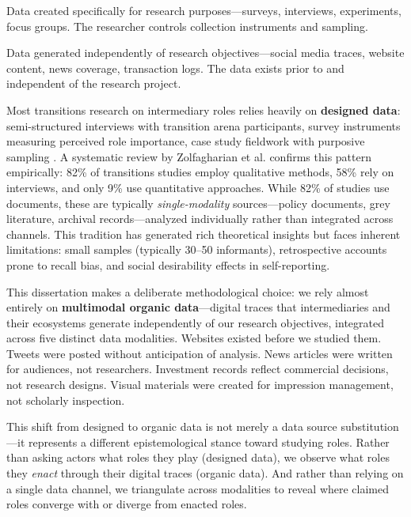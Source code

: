 \documentclass[../main.tex]{subfiles}
\begin{document}
\begin{description}[leftmargin=0.5cm, itemsep=0.3em]
\item[Designed data] Data created specifically for research purposes---surveys, interviews, experiments, focus groups. The researcher controls collection instruments and sampling.

\item[Organic data] Data generated independently of research objectives---social media traces, website content, news coverage, transaction logs. The data exists prior to and independent of the research project.
\end{description}

Most transitions research on intermediary roles relies heavily on \textbf{designed data}: semi-structured interviews with transition arena participants, survey instruments measuring perceived role importance, case study fieldwork with purposive sampling . A systematic review by Zolfagharian et al. \citeyear{zolfagharian2019studying} confirms this pattern empirically: 82\% of transitions studies employ qualitative methods, 58\% rely on interviews, and only 9\% use quantitative approaches. While 82\% of studies use documents, these are typically \emph{single-modality} sources---policy documents, grey literature, archival records---analyzed individually rather than integrated across channels. This tradition has generated rich theoretical insights but faces inherent limitations: small samples (typically 30--50 informants), retrospective accounts prone to recall bias, and social desirability effects in self-reporting.

\begin{insightbox}
This dissertation makes a deliberate methodological choice: we rely almost entirely on \textbf{multimodal organic data}---digital traces that intermediaries and their ecosystems generate independently of our research objectives, integrated across five distinct data modalities. Websites existed before we studied them. Tweets were posted without anticipation of analysis. News articles were written for audiences, not researchers. Investment records reflect commercial decisions, not research designs. Visual materials were created for impression management, not scholarly inspection.

This shift from designed to organic data is not merely a data source substitution---it represents a different epistemological stance toward studying roles. Rather than asking actors what roles they play (designed data), we observe what roles they \emph{enact} through their digital traces (organic data). And rather than relying on a single data channel, we triangulate across modalities to reveal where claimed roles converge with or diverge from enacted roles.
\end{insightbox}
\end{document}
